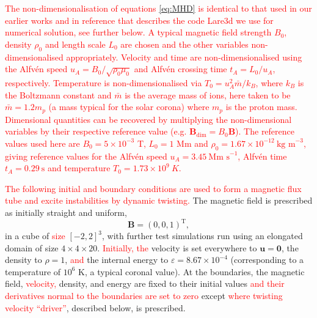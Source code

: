 \documentclass[12pt]{article}
\newcommand{\rs}[2]{\textcolor{red}{#2}}
\renewcommand{\vec}[1]{{\bm #1}}
\begin{document}
\rs{The non-dimensionalisation scheme and values align with the scheme
used by Lare3d~\cite{arberStaggeredGridLagrangian2001} and are
identical to those used
in~\cite{quinnEffectAnisotropicViscosity2020}.}
   {
The non-dimensionalisation of equations \eqref{eq:MHD} is identical to that used in
our earlier works
\cite{quinnEffectAnisotropicViscosity2020,quinnKelvinHelmholtzInstabilityCollapse2021} and in reference
\cite{arberStaggeredGridLagrangian2001} that describes the code Lare3d
we use for numerical solution, see further below. A typical magnetic
field strength $B_0$, density $\rho_0$ and length scale $L_0$ are
chosen and the other variables non-dimensionalised
appropriately. Velocity and time are non-dimensionalised using the
Alfv\'en speed $u_A = B_0 / \sqrt{\rho_0 \mu_0}$ and Alfv\'en crossing 
time $t_A = L_0/u_A$, respectively. Temperature is non-dimensionalised
via $T_0 = u_A^2 \bar{m} / k_B$, where $k_B$ is the Boltzmann constant
and $\bar{m}$ is the average mass of ions, here taken to be $\bar{m} =
1.2m_p$ (a mass typical for the solar corona) where $m_p$ is the
proton mass. Dimensional quantities can be recovered by multiplying
the non-dimensional variables by their respective reference value
(e.g. $\vec{B}_{\dim} = B_0 \vec{B}$). The reference values used here
are $B_0 = 5 \times 10^{-3}$ T, $L_0 = 1$ Mm and $\rho_0 = 1.67 \times
10^{-12} \ \text{kg m}^{-3}$, giving reference values for the Alfv\'en
speed $u_A = 3.45\ \text{Mm s}^{-1}$, Alfv\'en time $t_A =
0.29\ \text{s}$ and temperature $T_0 = 1.73 \times 10^{9}\ K$.      
   }



\rs{}{The following initial and boundary conditions are used to form a
magnetic flux tube and excite instabilities by dynamic twisting.} 
The magnetic field is prescribed as initially straight and uniform,
\begin{equation}
\vec{B} = (0, 0, 1)^{\text{T}},
\end{equation}
in a cube of \rs{dimension}{size} $[-2,2]^3$, with further test simulations run using an elongated domain of size $4\times4\times20$. \rs{The}{Initially, the} velocity is set
everywhere to $\vec{u} = \vec{0}$, the density to $\rho = 1$,
\rs{}{and} the
internal energy to $\varepsilon = 8.67\times 10^{-4}$ (corresponding
to a temperature of $10^6$ K, a typical coronal value).  At the
boundaries, the magnetic field, \rs{}{velocity,} density, and energy are fixed to their
initial values \rs{}{and their derivatives normal to the
boundaries are set to zero} \rs{and the velocity to zero}{} except
\rs{the boundaries}{where twisting velocity ``driver''}, described
below, is prescribed.
\rs{The spatial
derivatives of these variables are also set to zero at the
boundaries.}{} \rs{The resolution is $512$ grid points per dimension,
comparable to the highest resolution kink instability studies
of~\cite{hoodCoronalHeatingMagnetic2009} or medium resolution studies
of~\cite{barefordShockHeatingNumerical2015}.}{}
\end{document}
